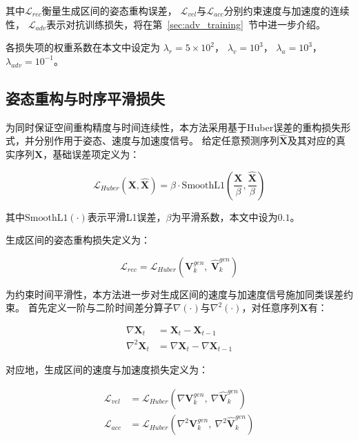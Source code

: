 其中$\mathcal{L}_{rec}$衡量生成区间的姿态重构误差，
$\mathcal{L}_{vel}$与$\mathcal{L}_{acc}$分别约束速度与加速度的连续性，
$\mathcal{L}_{adv}$表示对抗训练损失，将在第~\ref{sec:adv_training}~节中进一步介绍。

各损失项的权重系数在本文中设定为
$\lambda_r = 5\times10^{2}$，
$\lambda_v = 10^{3}$，
$\lambda_a = 10^{3}$，
$\lambda_{adv} = 10^{-1}$。

\subsection{姿态重构与时序平滑损失}
\label{subsec:reconstruction_smoothness_loss}

为同时保证空间重构精度与时间连续性，本方法采用基于Huber误差的重构损失形式，并分别作用于姿态、速度与加速度信号。
给定任意预测序列$\hat{\bm{X}}$及其对应的真实序列$\bm{X}$，基础误差项定义为：

\begin{equation}
\mathcal{L}_{Huber}(\bm{X}, \hat{\bm{X}})
=
\beta \cdot
\mathrm{SmoothL1}
\left(
\frac{\bm{X}}{\beta},
\frac{\hat{\bm{X}}}{\beta}
\right)
\label{eq:huber_loss}
\end{equation}

其中$\mathrm{SmoothL1}(\cdot)$表示平滑L1误差，$\beta$为平滑系数，本文中设为$0.1$。

生成区间的姿态重构损失定义为：

\begin{equation}
\mathcal{L}_{rec} = \mathcal{L}_{Huber}(\bm{V}_k^{gen},\ \hat{\bm{V}}_k^{gen})
\label{eq:rec_loss}
\end{equation}

为约束时间平滑性，本方法进一步对生成区间的速度与加速度信号施加同类误差约束。
首先定义一阶与二阶时间差分算子$\nabla(\cdot)$与$\nabla^2(\cdot)$，对任意序列$\bm{X}$有：

\begin{align}
\nabla \bm{X}_t &= \bm{X}_t - \bm{X}_{t-1}\\
\nabla^2 \bm{X}_t &= \nabla \bm{X}_t - \nabla \bm{X}_{t-1}
\label{eq:diff_def}
\end{align}

对应地，生成区间的速度与加速度损失定义为：

\begin{align}
\mathcal{L}_{vel} &= \mathcal{L}_{Huber}(\nabla \bm{V}_k^{gen},\ \nabla \hat{\bm{V}}_k^{gen})
\label{eq:vel_loss}\\
\mathcal{L}_{acc} &= \mathcal{L}_{Huber}(\nabla^2 \bm{V}_k^{gen},\ \nabla^2 \hat{\bm{V}}_k^{gen})
\label{eq:acc_loss}
\end{align}

